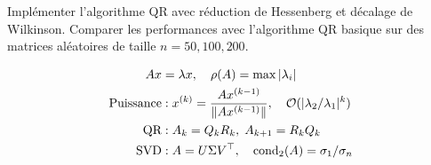 \begin{exercice}
Impl\'ementer l'algorithme QR avec r\'eduction de Hessenberg et d\'ecalage de Wilkinson. Comparer les performances avec l'algorithme QR basique sur des matrices al\'eatoires de taille $n=50,100,200$.
\end{exercice}

\begin{formules}
\begin{align*}
Ax &= \lambda x, \quad \rho(A)=\max|\lambda_i| \\
\text{Puissance} &: x^{(k)}=\frac{Ax^{(k-1)}}{\|Ax^{(k-1)}\|}, \quad \mathcal{O}(|\lambda_2/\lambda_1|^k) \\
\text{QR} &: A_k=Q_kR_k,\; A_{k+1}=R_kQ_k \\
\text{SVD} &: A=U\Sigma V^\top, \quad \mathrm{cond}_2(A)=\sigma_1/\sigma_n
\end{align*}
\end{formules}
